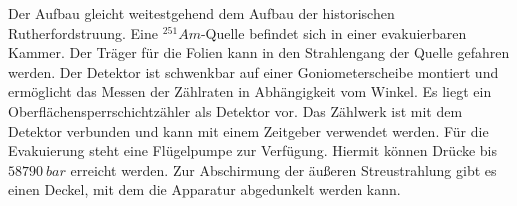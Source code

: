 Der Aufbau gleicht weitestgehend dem Aufbau der historischen Rutherfordstruung.
Eine $^{251}Am$-Quelle befindet sich in einer evakuierbaren Kammer.
Der Träger für die Folien kann in den Strahlengang der Quelle gefahren werden.
Der Detektor ist schwenkbar auf einer Goniometerscheibe montiert und ermöglicht das Messen der Zählraten in Abhängigkeit vom Winkel.
Es liegt ein Oberflächensperrschichtzähler als Detektor vor.
Das Zählwerk ist mit dem Detektor verbunden und kann mit einem Zeitgeber verwendet werden.
Für die Evakuierung steht eine Flügelpumpe zur Verfügung.
Hiermit können Drücke bis $\SI{58790}{bar}$ erreicht werden.
Zur Abschirmung der äußeren Streustrahlung gibt es einen Deckel, mit dem die Apparatur abgedunkelt werden kann.
%
%

